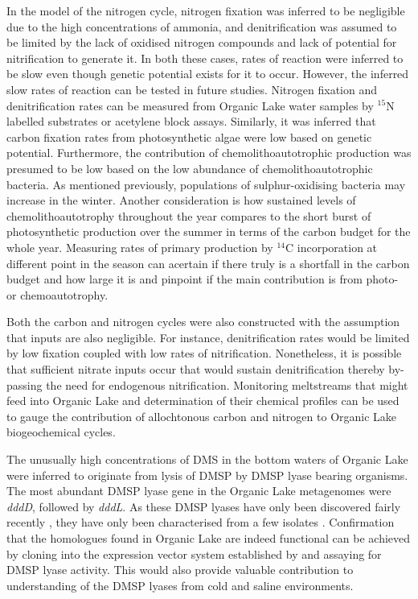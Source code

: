 In the model of the nitrogen cycle, nitrogen fixation was inferred to be negligible due to the high concentrations of ammonia, and denitrification was assumed to be limited by the lack of oxidised nitrogen compounds and lack of potential for nitrification to generate it.
In both these cases, rates of reaction were inferred to be slow even though genetic potential exists for it to occur.
However, the inferred slow rates of reaction can be tested in future studies.
Nitrogen fixation and denitrification rates can be measured from Organic Lake water samples by $^15$N labelled substrates or acetylene block assays.
Similarly, it was inferred that carbon fixation rates from photosynthetic algae were low based on genetic potential.
Furthermore, the contribution of chemolithoautotrophic production was presumed to be low based on the low abundance of chemolithoautotrophic bacteria. 
As mentioned previously, populations of sulphur-oxidising bacteria may increase in the winter.
Another consideration is how sustained levels of chemolithoautotrophy throughout the year compares to the short burst of photosynthetic production over the summer in terms of the carbon budget for the whole year.
Measuring rates of primary production by $^14$C incorporation at different point in the season can acertain if there truly is a shortfall in the carbon budget and how large it is and pinpoint if the main contribution is from photo- or chemoautotrophy.

Both the carbon and nitrogen cycles were also constructed with the assumption that inputs are also negligible.
For instance, denitrification rates would be limited by low fixation coupled with low rates of nitrification.
Nonetheless, it is possible that sufficient nitrate inputs occur that would sustain denitrification thereby by-passing the need for endogenous nitrification.
Monitoring meltstreams that might feed into Organic Lake and determination of their chemical profiles can be used to gauge the contribution of allochtonous carbon and nitrogen to Organic Lake biogeochemical cycles.

The unusually high concentrations of \ac{DMS} in the bottom waters of Organic Lake were inferred to originate from lysis of \ac{DMSP} by \ac{DMSP} lyase bearing organisms.
The most abundant \ac{DMSP} lyase gene in the Organic Lake metagenomes were \emph{dddD}, followed by \emph{dddL}.
As these \ac{DMSP} lyases have only been discovered fairly recently \cite{Todd2007, Curson2008}, they have only been characterised from a few isolates \cite{Todd2007, Curson2008, Curson2010, Todd2010, Curson2012}.
Confirmation that the homologues found in Organic Lake are indeed functional can be achieved by cloning into the expression vector system established by \citet{Todd2007} and assaying for \ac{DMSP} lyase activity.
This would also provide valuable contribution to understanding of the \ac{DMSP} lyases from cold and saline environments.

